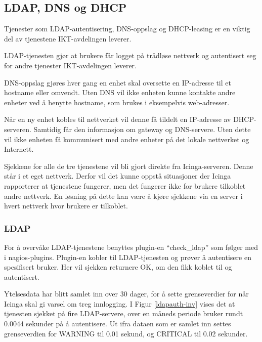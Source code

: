 \subsection{LDAP, DNS og DHCP}
Tjenester som LDAP-autentisering, DNS-oppslag og DHCP-leasing er en viktig del av tjenestene IKT-avdelingen leverer.

LDAP-tjenesten\cite{ldap} gjør at brukere får logget på trådløse nettverk og autentisert seg for andre tjenester IKT-avdelingen leverer.

DNS-oppslag gjøres hver gang en enhet skal oversette en IP-adresse til et hostname eller omvendt. Uten DNS vil ikke enheten kunne kontakte andre enheter ved å benytte hostname, som brukes i eksempelvis web-adresser\cite{dns}. 

Når en ny enhet kobles til nettverket vil denne få tildelt en IP-adresse av DHCP-serveren. Samtidig får den informasjon om gateway og DNS-servere. Uten dette vil ikke enheten få kommunisert med andre enheter på det lokale nettverket og Internett\cite{dhcp}.

Sjekkene for alle de tre tjenestene vil bli gjort direkte fra Icinga-serveren. Denne står i et eget nettverk. Derfor vil det kunne oppstå situasjoner der Icinga rapporterer at tjenestene fungerer, men det fungerer ikke for brukere tilkoblet andre nettverk. En løsning på dette kan være å kjøre sjekkene via en server i hvert nettverk hvor brukere er tilkoblet.

\subsubsection*{LDAP}
For å overvåke LDAP-tjenestene benyttes plugin-en ``check\_ldap'' som følger med i nagios-plugins. Plugin-en kobler til LDAP-tjenesten og prøver å autentisere en spesifisert bruker. Her vil sjekken returnere OK, om den fikk koblet til og autentisert. 

Ytelsesdata har blitt samlet inn over 30 dager, for å sette grenseverdier for når Icinga skal gi varsel om treg innlogging. I Figur \ref{ldapauth-inv} vises det at tjenesten sjekket på fire LDAP-servere, over en måneds periode bruker rundt 0.0044 sekunder på å autentisere. Ut ifra dataen som er samlet inn settes grenseverdien for WARNING til 0.01 sekund, og CRITICAL til 0.02 sekunder.

